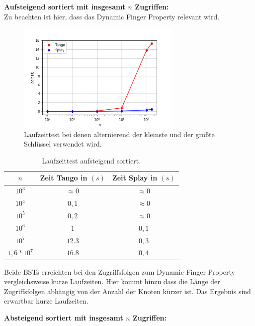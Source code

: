 \documentclass[a4paper,12pt]{article}
\begin{document}
 \bigskip

\noindent \textbf{Aufsteigend sortiert mit insgesamt $n$ Zugriffen:}\\
\bigskip
Zu beachten ist hier, dass das Dynamic Finger Property relevant wird. 

\begin{figure}[H]
	\centering
	\includegraphics[width=0.7\textwidth]{Medien/laufzeittest/diagramm/sorted1}
	\caption{Laufzeittest bei denen alternierend der kleinste und der größte Schlüssel verwendet wird.}
\end{figure}
\begin{table}[H]
	\begin{center}
		\begin{tabular}[c]{|c|c|c|}
			\hline
			$n$ & Zeit Tango in $\left(s\right)$ &Zeit Splay in $\left(s\right)$ \\
			\hline
			$10^3$ & $\approx 0$ &$\approx 0$ \\
			\hline
			$10^4$  & $0,1$ &$\approx 0$  \\
			\hline
			$10^5$  & $0,2$ &$\approx 0$  \\
			\hline
			$10^6$  & $1$ &$0,1$  \\
			\hline
			$10^7$  & $12.3$ &$0,3$  \\
			\hline
			$1,6 *10^7$  & $16.8$ &$0,4$  \\
			\hline
		\end{tabular}
		\caption{Laufzeittest aufsteigend sortiert.} 
	\end{center}
\end{table}
\noindent Beide BSTs erreichten bei den Zugriffsfolgen zum Dynamic Finger Property  vergleichsweise kurze Laufzeiten. Hier kommt hinzu dass die Länge der Zugriffsfolgen abhängig von der Anzahl der Knoten kürzer ist. Das Ergebnis sind erwartbar kurze Laufzeiten.
\newpage

\bigskip
\noindent \textbf{Absteigend sortiert mit insgesamt $n$ Zugriffen:\\}
\end{document}
